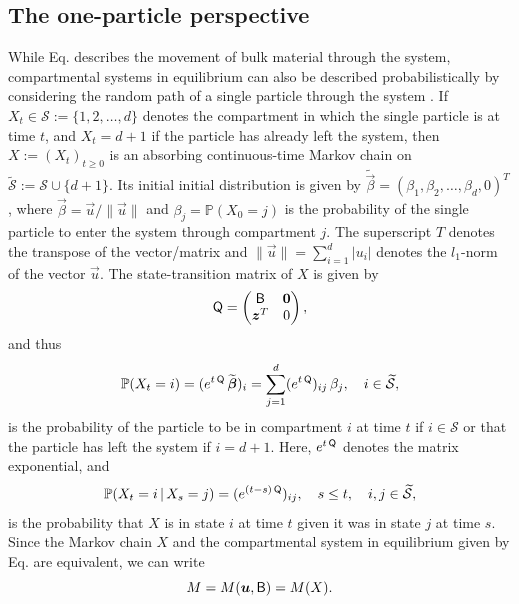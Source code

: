 \documentclass[smallextended]{svjour3}
\makeatletter
\renewcommand*{\eqref}[1]{%
  \hyperref[{#1}]{\textup{\tagform@{\ref*{#1}}}}%
}
\renewcommand{\P}{\mathbb{P}}
\newcommand{\suml}{\sum\limits}
\newcommand{\vnorms}[1]{\|#1\|}
\makeatother
\begin{document}
\subsection{The one-particle perspective}
\label{sec:the_one_particle_perspective}
While Eq. \eqref{eqn:lin_CS_sys} describes the movement of bulk material through the system, compartmental systems in equilibrium can also be described probabilistically by considering the random path of a single particle through the system \citep{Metzler2018MGS}.
If $X_t\in\mathcal{S}:=\{1,2,\ldots,d\}$ denotes the compartment in which the single particle is at time $t$, and $X_t=d+1$ if the particle has already left the system, then $X:=(X_t)_{t\geq0}$ is an absorbing continuous-time Markov chain \citep{Norris1997} on $\widetilde{\mathcal{S}}:=\mathcal{S}\cup\{d+1\}$.
Its initial initial distribution is given by $\widetilde{\vec{\beta}}=(\beta_1, \beta_2, \ldots, \beta_d, 0)^T$, where $\vec{\beta}=\vec{u}/\vnorms{\vec{u}}$ and $\beta_j=\P(X_0=j)$ is the probability of the single particle to enter the system through compartment $j$.
The superscript $T$ denotes the transpose of the vector/matrix  and $\vnorms{\vec{u}}=\sum_{i=1}^d |u_i|$ denotes the $l_1$-norm of the vector $\vec{u}$.
The state-transition matrix of $X$ is given by
\begin{equation}\label{eqn:Q}
  \tens{Q} =
  \begin{pmatrix}
    \tens{B} & \vec{0} \\
    \vec{z}^T & 0
  \end{pmatrix},
\end{equation}
and thus
\begin{equation*}
  \P(X_t=i) = (e^{t\,\tens{Q}}\,\widetilde{\vec{\beta}})_i = \suml_{j=1}^d (e^{t\,\tens{Q}})_{ij}\,\beta_j, \quad i\in\widetilde{\mathcal{S}},
\end{equation*}
is the probability of the particle to be in compartment $i$ at time $t$ if $i\in\mathcal{S}$ or that the particle has left the system if $i=d+1$.
Here, $e^{t\,\mathsf{Q}}$ denotes the matrix exponential, and 
\begin{equation*}
  \P(X_t=i\,|\,X_s=j) = (e^{(t-s)\,\tens{Q}})_{ij},\quad s\leq t,\quad i,j\in\widetilde{\mathcal{S}},
\end{equation*}
is the probability that $X$ is in state $i$ at time $t$ given it was in state $j$ at time $s$.
Since the Markov chain $X$ and the compartmental system in equilibrium given by Eq. \eqref{eqn:lin_CS_sys} are equivalent, we can write
\begin{equation*}
  M=M(\vec{u},\tens{B}) = M(X).
\end{equation*}
\end{document}
